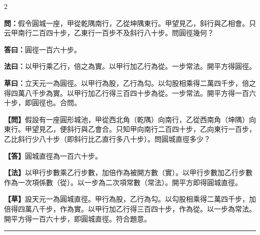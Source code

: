 \documentclass[11pt,a4paper]{article}
\newcommand{\longline}{\noindent\rule{\textwidth}{0.4pt}}
\newcommand{\wenC}[1]{\par\noindent\textbf{\textcolor{probcolor}{問：}}{#1}\par}
\newcommand{\daC}[1]{\par\noindent\textbf{\textcolor{anscolor}{答曰：}}{#1}\par}
\newcommand{\fayueC}[1]{\par\noindent\textbf{\textcolor{methodcolor}{法曰：}}{#1}\par}
\newcommand{\caoyueC}[1]{\par\noindent\textbf{草曰：}{#1}\par}
\newcommand{\wenM}[1]{\par\noindent\textbf{\textcolor{probcolor}{【問】}}{#1}\par}
\newcommand{\daM}[1]{\par\noindent\textbf{\textcolor{anscolor}{【答】}}{#1}\par}
\newcommand{\fayueM}[1]{\par\noindent\textbf{\textcolor{methodcolor}{【法】}}{#1}\par}
\newcommand{\caoyueM}[1]{\par\noindent\textbf{【草】}{#1}\par}
\begin{document}
\begin{paracol}{2}

\wenC{假令圓城一座，甲從乾隅南行，乙從坤隅東行。甲望見乙，斜行與乙相會。只云甲南行二百四十步，乙東行一百步不及斜行八十步。問圓徑幾何？}

\daC{圓徑一百六十步。}

\fayueC{以甲行乘乙行，倍之為實。以甲行加乙行為從。一步常法。開平方得圓徑。}

\caoyueC{立天元一為圓徑。以甲行為股，乙行為勾。以勾股相乘得二萬四千步，倍之得四萬八千步為實。以甲行加乙行得三百四十步為從。一步常法。開平方得一百六十步，即圓徑也。合問。}

\switchcolumn

\wenM{假設有一座圓形城池，甲從西北角（乾隅）向南行，乙從西南角（坤隅）向東行。甲望見乙，便斜行與乙會合。只知甲向南行二百四十步，乙向東行一百步，乙比斜行少八十步（即斜行比乙直行多八十步）。問圓城直徑多少？}

\daM{圓城直徑為一百六十步。}

\fayueM{以甲行步數乘乙行步數，加倍作為被開方數（實）。以甲行步數加乙行步數作為一次項係數（從）。以一步為二次項常數（常法）。開平方即得圓城直徑。}

\caoyueM{設天元一為圓城直徑。甲行為股，乙行為勾。以勾股相乘得二萬四千步，加倍得四萬八千步，作為實。以甲行加乙行得三百四十步，作為從。以一步為常法。開平方得一百六十步，即圓城直徑。符合題意。}

\end{paracol}

\vspace{0.3cm}
\longline
\end{document}
